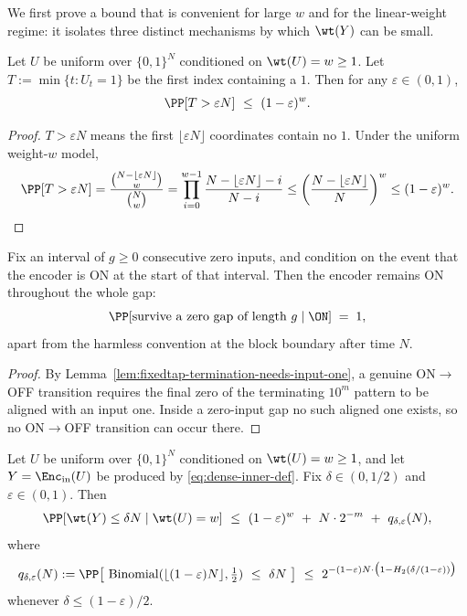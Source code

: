 We first prove a bound that is convenient for large $w$ and for the linear-weight regime:
it isolates three distinct mechanisms by which $\wt(Y)$ can be small.

\begin{lemma}
\label{lem:first-one-early}
Let $U$ be uniform over $\{0,1\}^N$ conditioned on $\wt(U)=w\ge 1$.
Let $T:=\min\{t:U_t=1\}$ be the first index containing a $1$.
Then for any $\varepsilon\in(0,1)$,
\[
\PP[T>\varepsilon N]\ \le\ (1-\varepsilon)^w.
\]
\end{lemma}

\begin{proof}
$T>\varepsilon N$ means the first $\lfloor \varepsilon N\rfloor$ coordinates contain no $1$.
Under the uniform weight-$w$ model,
\[
\PP[T>\varepsilon N]
=
\frac{\binom{N-\lfloor\varepsilon N\rfloor}{w}}{\binom{N}{w}}
=
\prod_{i=0}^{w-1}\frac{N-\lfloor\varepsilon N\rfloor-i}{N-i}
\le
\left(\frac{N-\lfloor\varepsilon N\rfloor}{N}\right)^w
\le
(1-\varepsilon)^w.
\]
\end{proof}

\begin{corollary}
\label{cor:dense-gap-survival}
Fix an interval of $g\ge 0$ consecutive zero inputs, and condition on the event that the encoder is ON at the start of
that interval. Then the encoder remains ON throughout the whole gap:
\begin{equation}
\label{eq:dense-gap-survival}
\PP[\text{survive a zero gap of length }g \mid \ON]
\;=\;
1,
\end{equation}
apart from the harmless convention at the block boundary after time \(N\).
\end{corollary}

\begin{proof}
By Lemma~\ref{lem:fixedtap-termination-needs-input-one}, a genuine ON\(\to\)OFF transition requires the final zero of
the terminating \(10^m\) pattern to be aligned with an input one. Inside a zero-input gap no such aligned one exists,
so no ON\(\to\)OFF transition can occur there.
\end{proof}

\begin{lemma}
\label{lem:dense-three-term-tail}
Let $U$ be uniform over $\{0,1\}^N$ conditioned on $\wt(U)=w\ge 1$, and let $Y=\Enc_{\mathrm{in}}(U)$ be produced by
\eqref{eq:dense-inner-def}. Fix $\delta\in(0,1/2)$ and $\varepsilon\in(0,1)$. Then
\begin{equation}
\label{eq:dense-three-term}
\PP[\wt(Y)\le \delta N \mid \wt(U)=w]
\ \le\
(1-\varepsilon)^w\ +\ N\cdot 2^{-m}\ +\ q_{\delta,\varepsilon}(N),
\end{equation}
where
\[
q_{\delta,\varepsilon}(N)
:=
\PP\!\left[\ \mathrm{Binomial}(\lfloor(1-\varepsilon)N\rfloor,\tfrac12)\ \le\ \delta N\ \right]
\ \le\
2^{-(1-\varepsilon)N\cdot \big(1-H_2(\delta/(1-\varepsilon))\big)}
\]
whenever $\delta\le (1-\varepsilon)/2$.
\end{lemma}

